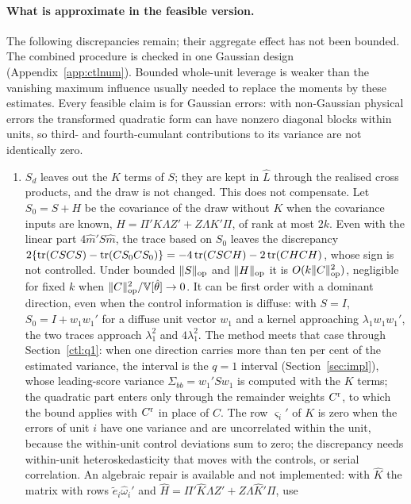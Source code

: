 \paragraph{What is approximate in the feasible version.} The following discrepancies remain; their aggregate
effect has not been bounded. The combined procedure is checked in one Gaussian design
(Appendix~\ref{app:ctlnum}). Bounded whole-unit leverage is weaker than the vanishing maximum influence usually
needed to replace the moments by these estimates. Every feasible claim is for Gaussian errors: with non-Gaussian
physical errors the transformed quadratic form can have nonzero diagonal blocks within units, so third- and
fourth-cumulant contributions to its variance are not identically zero.
\begin{enumerate}\itemsep1pt
\item $S_d$ leaves out the $K$ terms of $S$; they are kept in $\hat L$ through the realised cross products, and the
draw is not changed. This does not compensate. Let $S_0=S+H$ be the covariance of the draw without $K$ when the
covariance inputs are known, $H=\Pi'K\Lambda Z'+Z\Lambda K'\Pi$, of rank at most $2k$. Even with the linear part
$4\hat m'S\hat m$, the trace based on $S_0$ leaves the discrepancy
$2\{\operatorname{tr}(CSCS)-\operatorname{tr}(CS_0CS_0)\}=-4\operatorname{tr}(CSCH)-2\operatorname{tr}(CHCH)$, whose sign is not controlled. Under bounded $\|S\|_{\mathrm{op}}$ and
$\|H\|_{\mathrm{op}}$ it is $O(k\|C\|_{\mathrm{op}}^2)$, negligible for fixed $k$ when $\|C\|_{\mathrm{op}}^2/\mathbb{V}[\hat\theta]\to0$. It can be first
order with a dominant direction, even when the control information is diffuse: with $S=I$, $S_0=I+w_1w_1'$ for a
diffuse unit vector $w_1$ and a kernel approaching $\lambda_1w_1w_1'$, the two traces approach $\lambda_1^2$ and
$4\lambda_1^2$.
The method meets that case through Section~\ref{ctl:q1}: when one direction carries more than ten per cent of the
estimated variance, the interval is the $q=1$ interval (Section~\ref{sec:impl}), whose leading-score variance
$\Sigma_{bb}=w_1'Sw_1$ is computed with the $K$ terms; the quadratic part enters only through the remainder
weights $C^{\rm r}$, to which the bound applies with $C^{\rm r}$ in place of $C$. The row $\varsigma_i'$ of $K$ is zero
when the errors of unit $i$ have one variance and are uncorrelated within the unit, because the within-unit control
deviations sum to zero; the discrepancy needs within-unit heteroskedasticity that moves with the controls, or
serial correlation. An algebraic repair is available and not implemented: with $\hat K$ the matrix with rows
$\tilde e_i\hat\omega_i'$ and $\hat H=\Pi'\hat K\Lambda Z'+Z\Lambda\hat K'\Pi$, use

\end{enumerate}
